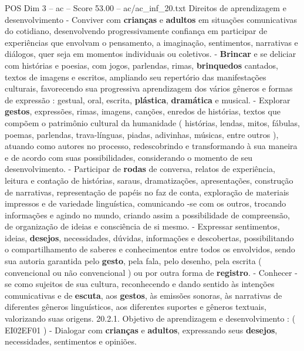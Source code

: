 \begin{textsample}{POS Dim 3 – ac – Score 53.00 – ac/ac\_inf\_20.txt}
Direitos de aprendizagem e desenvolvimento - Conviver com \textbf{crianças} e \textbf{adultos} em situações comunicativas do cotidiano, desenvolvendo progressivamente confiança em participar de experiências que envolvam o pensamento, a imaginação, sentimentos, narrativas e diálogos, quer seja em momentos individuais ou coletivos. - \textbf{Brincar} e se deliciar com histórias e poesias, com jogos, parlendas, rimas, \textbf{brinquedos} cantados, textos de imagens e escritos, ampliando seu repertório das manifestações culturais, favorecendo sua progressiva aprendizagem dos vários gêneros e formas de expressão : gestual, oral, escrita, \textbf{plástica}, \textbf{dramática} e musical. - Explorar \textbf{gestos}, expressões, rimas, imagens, canções, enredos de histórias, textos que compõem o patrimônio cultural da humanidade ( histórias, lendas, mitos, fábulas, poemas, parlendas, trava-línguas, piadas, adivinhas, músicas, entre outros ), atuando como autores no processo, redescobrindo e transformando à sua maneira e de acordo com suas possibilidades, considerando o momento de seu desenvolvimento. - Participar de \textbf{rodas} de conversa, relatos de experiência, leitura e contação de histórias, saraus, dramatizações, apresentações, construção de narrativas, representação de papéis no faz de conta, exploração de materiais impressos e de variedade linguística, comunicando -se com os outros, trocando informações e agindo no mundo, criando assim a possibilidade de compreensão, de organização de ideias e consciência de si mesmo. - Expressar sentimentos, ideias, \textbf{desejos}, necessidades, dúvidas, informações e descobertas, possibilitando o compartilhamento de saberes e conhecimentos entre todos os envolvidos, sendo sua autoria garantida pelo \textbf{gesto}, pela fala, pelo desenho, pela escrita ( convencional ou não convencional ) ou por outra forma de \textbf{registro}. - Conhecer -se como sujeitos de sua cultura, reconhecendo e dando sentido às intenções comunicativas e de \textbf{escuta}, aos \textbf{gestos}, às emissões sonoras, às narrativas de diferentes gêneros linguísticos, aos diferentes suportes e gêneros textuais, valorizando suas origens. 20.2.1.
Objetivo de aprendizagem e desenvolvimento : ( EI02EF01 ) - Dialogar com \textbf{crianças} e \textbf{adultos}, expressando seus \textbf{desejos}, necessidades, sentimentos e opiniões.

\end{textsample}
